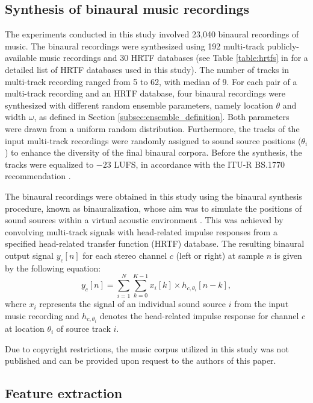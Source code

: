 \documentclass{article}
\begin{document}
\subsection{Synthesis of binaural music recordings}
\label{subsec:synthesis}

The experiments conducted in this study involved 23,040 binaural recordings of music. The binaural recordings were synthesized using 192 multi-track publicly-available music recordings \cite{noauthor_mixing_nodate} and 30 HRTF databases (see Table \ref{table:hrtfs} in  for a detailed list of HRTF databases used in this study). The number of tracks in multi-track recording ranged from 5 to 62, with median of 9. For each pair of a multi-track recording and an HRTF database, four binaural recordings were synthesized with different random ensemble parameters, namely location $\theta$ and width $\omega$, as defined in Section \ref{subsec:ensemble_definition}. Both parameters were drawn from a uniform random distribution. Furthermore, the tracks of the input multi-track recordings were randomly assigned to sound source positions ($\theta_i$) to enhance the diversity of the final binaural corpora. Before the synthesis, the tracks were equalized to $-23$ LUFS, in accordance with the ITU-R BS.1770 recommendation \cite{noauthor_recommendation_nodate}.

The binaural recordings were obtained in this study using the binaural synthesis procedure, known as binauralization, whose aim was to simulate the positions of sound sources within a virtual acoustic environment \cite{blauert_spatial_1996}. This was achieved by convolving multi-track signals with head-related impulse responses from a specified head-related transfer function (HRTF) database. The resulting binaural output signal $y_c[n]$ for each stereo channel $c$ (left or right) at sample $n$ is given by the following equation:
\begin{equation}
  y_c[n] = \sum_{i=1}^{N} \sum_{k=0}^{K-1} x_i[k] \times h_{c,\theta_i}[n-k] ,
\end{equation}
where $x_i$ represents the signal of an individual sound source $i$ from the input music recording and $h_{c,\theta_i}$ denotes the head-related impulse response for channel $c$ at location $\theta_i$ of source track $i$.

Due to copyright restrictions, the music corpus utilized in this study was not published and can be provided upon request to the authors of this paper.

\subsection{Feature extraction}
\label{subsec:feature_extraction}
\end{document}
